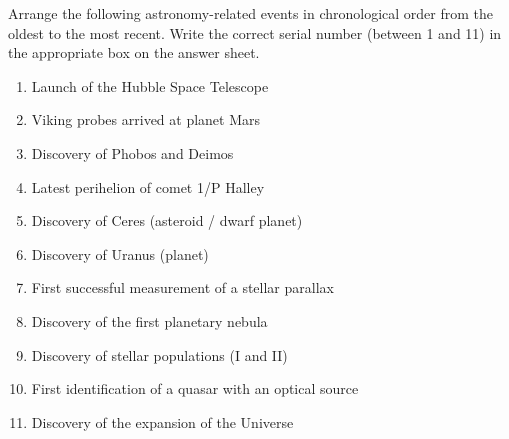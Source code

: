 Arrange the following astronomy-related events in chronological order from the
oldest to the most recent. Write the correct serial number (between 1 and 11)
in the appropriate box on the answer sheet.

\begin{enumerate}
\item Launch of the Hubble Space Telescope
\item Viking probes arrived at planet Mars
\item Discovery of Phobos and Deimos
\item Latest perihelion of comet 1/P Halley
\item Discovery of Ceres (asteroid / dwarf planet)
\item Discovery of Uranus (planet)
\item First successful measurement of a stellar parallax
\item Discovery of the first planetary nebula
\item Discovery of stellar populations (I and II)
\item First identification of a quasar with an optical source
\item Discovery of the expansion of the Universe
\end{enumerate}
